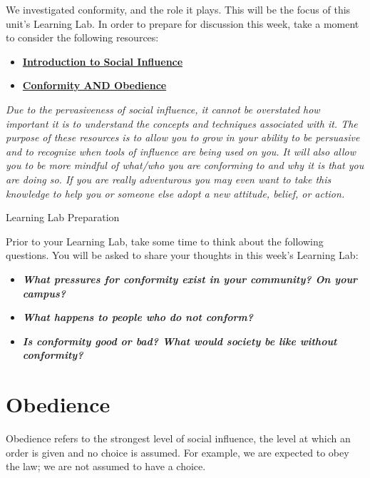 \documentclass[
]{book}
\providecommand{\tightlist}{%
  \setlength{\itemsep}{0pt}\setlength{\parskip}{0pt}}
\begin{document}
\begin{reflect}
We investigated conformity, and the role it plays. This will be the focus of this unit's Learning Lab. In order to prepare for discussion this week, take a moment to consider the following resources:

\begin{itemize}
\tightlist
\item
  \href{http://www.workingpsychology.com/intro.html}{\textbf{Introduction to Social Influence}}\\
\item
  \href{https://webspace.ship.edu/cgboer/conformity.html}{\textbf{Conformity AND Obedience}}
\end{itemize}

\emph{Due to the pervasiveness of social influence, it cannot be overstated how important it is to understand the concepts and techniques associated with it. The purpose of these resources is to allow you to grow in your ability to be persuasive and to recognize when tools of influence are being used on you. It will also allow you to be more mindful of what/who you are conforming to and why it is that you are doing so. If you are really adventurous you may even want to take this knowledge to help you or someone else adopt a new attitude, belief, or action.}

{Learning Lab Preparation}

Prior to your Learning Lab, take some time to think about the following questions. You will be asked to share your thoughts in this week's Learning Lab:

\begin{itemize}
\tightlist
\item
  \textbf{\emph{What pressures for conformity exist in your community? On your campus?}}\\
\item
  \textbf{\emph{What happens to people who do not conform?}}\\
\item
  \textbf{\emph{Is conformity good or bad? What would society be like without conformity?}}
\end{itemize}
\end{reflect}

\hypertarget{obedience}{%
\section{Obedience}\label{obedience}}

Obedience refers to the strongest level of social influence, the level at which an order is given and no choice is assumed. For example, we are expected to obey the law; we are not assumed to have a choice.
\end{document}
